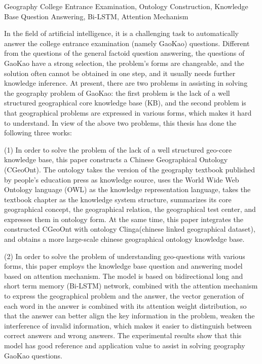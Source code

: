 \begin{englishabstract}{Geography College Entrance Examination, Ontology Construction, Knowledge Base Question Answering, Bi-LSTM, Attention Mechanism}

	In the field of artificial intelligence, it is a challenging task to automatically answer the college entrance examination (namely GaoKao) questions. Different from the questions of the general factoid question answering, the questions of GaoKao have a strong selection, the problem's forms are changeable, and the solution often cannot be obtained in one step, and it usually needs further knowledge inference. At present, there are two problems in assisting in solving the geography problem of GaoKao: the first problem is the lack of a well structured geographical core knowledge base (KB), and the second problem is that geographical problems are expressed in various forms, which makes it hard to understand. In view of the above two problems, this thesis has done the following three works:
	
(1) In order to solve the problem of the lack of a well structured geo-core knowledge base, this paper constructs a Chinese Geographical Ontology (CGeoOnt). The ontology takes the  version of the geography textbook published by people's education press as knowledge source, uses the World Wide Web Ontology language (OWL) as the knowledge representation language, takes the textbook chapter as the knowledge system structure, summarizes its core geographical concept, the geographical relation, the geographical test center, and expresses them in ontology form. At the same time, this paper integrates the constructed CGeoOnt with ontology Clinga(chinese linked geographical dataset), and obtains a more large-scale chinese geographical ontology knowledge base.
	
(2) In order to solve  the problem of understanding geo-questions with various forms, this paper employs the knowledge base question and answering model based on attention mechanism. The model is based on bidirectional long and short term memory (Bi-LSTM) network, combined with the attention mechanism to express the geographical problem and the answer, the vector generation of each word in the answer is combined with its attention weight distribution, so that the answer can better align the key information in the problem, weaken the interference of invalid information, which makes it easier to distinguish between correct answers and wrong answers. The experimental results show that this model has good reference and application value to assist in solving geography GaoKao questions.


\end{englishabstract}
